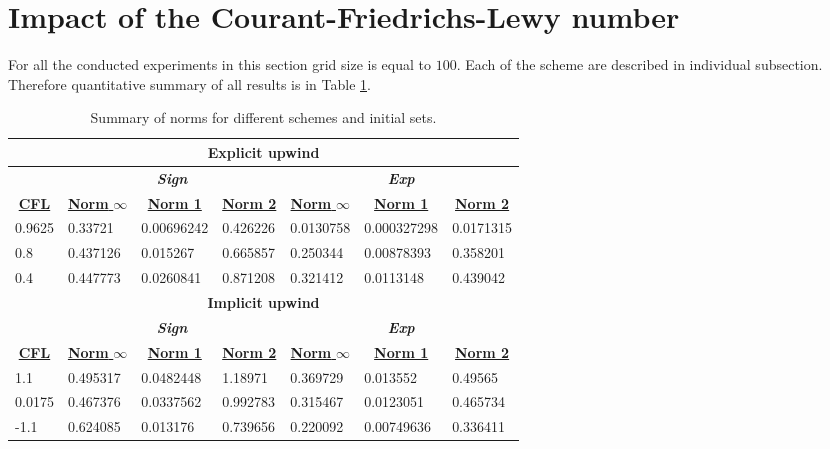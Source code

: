 \section{Impact of the Courant-Friedrichs-Lewy number} \label{sec:impactCFL}
	For all the conducted experiments in this section grid size is equal to $100$. Each of the scheme are described in individual subsection. Therefore quantitative summary of all results is in Table \ref{tab:impactCFL}.
	
	
	
	
	
	
	\begin{table}[]
		\centering
		\caption{Summary of norms for different schemes and initial sets.}
		\label{tab:impactCFL}
				\begin{tabular}{|l|l|l|l|l|l|l|}
					\hline
					\multicolumn{7}{|c|}{\textbf{Explicit upwind}} \\ \hline
					& \multicolumn{3}{|c|}{\textit{\textbf{Sign}}} & \multicolumn{3}{|c|}{\textit{\textbf{Exp}}} \\ \hline
					\multicolumn{1}{|c|}{{\ul \textbf{CFL}}} & \multicolumn{1}{|c|}{{\ul \textbf{Norm }$\infty$}} & \multicolumn{1}{c}{{\ul \textbf{Norm 1}}} & \multicolumn{1}{|c|}{{\ul \textbf{Norm 2}}} & \multicolumn{1}{|c|}{{\ul \textbf{Norm }$\infty$}} & \multicolumn{1}{|c|}{{\ul \textbf{Norm 1}}} & \multicolumn{1}{|c|}{{\ul \textbf{Norm 2}}} \\ \hline \hline
					0.9625 & 0.33721 & 0.00696242 & 0.426226 & 0.0130758 & 0.000327298 & 0.0171315 \\ \hline
					0.8 & 0.437126 & 0.015267 & 0.665857 & 0.250344 & 0.00878393 & 0.358201 \\ \hline
					0.4 & 0.447773 & 0.0260841 & 0.871208 & 0.321412 & 0.0113148 & 0.439042 \\ \hline \hline
					
					\multicolumn{7}{|c|}{\textbf{Implicit upwind}} \\ \hline
					& \multicolumn{3}{|c|}{\textit{\textbf{Sign}}} & \multicolumn{3}{|c|}{\textit{\textbf{Exp}}} \\ \hline
					\multicolumn{1}{|c|}{{\ul \textbf{CFL}}} & \multicolumn{1}{|c|}{{\ul \textbf{Norm }$\infty$}} & \multicolumn{1}{|c|}{{\ul \textbf{Norm 1}}} & \multicolumn{1}{|c|}{{\ul \textbf{Norm 2}}} & \multicolumn{1}{|c|}{{\ul \textbf{Norm }$\infty$}} & \multicolumn{1}{|c|}{{\ul \textbf{Norm 1}}} & \multicolumn{1}{||c|}{{\ul \textbf{Norm 2}}} \\ \hline \hline
					1.1 & 0.495317 & 0.0482448 & 1.18971 & 0.369729 & 0.013552 & 0.49565 \\ \hline
					0.0175 & 0.467376 & 0.0337562 & 0.992783 & 0.315467 & 0.0123051 & 0.465734 \\ \hline
					-1.1 & 0.624085 & 0.013176 & 0.739656 & 0.220092 & 0.00749636 & 0.336411 \\ \hline
					\hline
					

\end{tabular}
\end{table}
